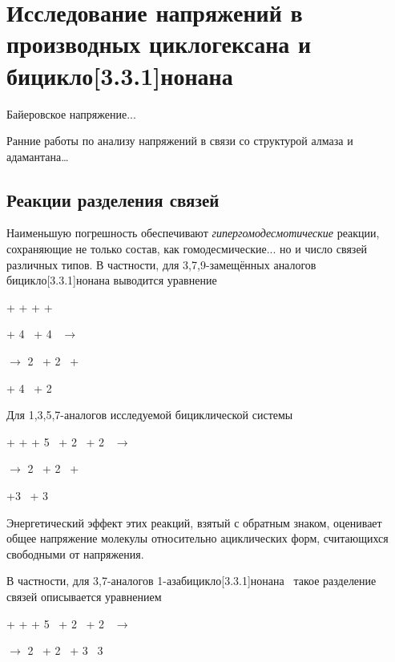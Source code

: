 \chapter{Исследование напряжений в производных циклогексана и бицикло[3.3.1]нонана}\label{ch:Strain:331}

Байеровское напряжение...

Ранние работы по анализу напряжений в связи со структурой алмаза и адамантана\dots~\cite{Mohr:1918}

\section{Реакции разделения связей}

Наименьшую погрешность обеспечивают \emph{гипергомодесмотические} реакции, сохраняющие не только состав, как гомодесмические... но и число связей различных типов. В частности, для 3,7,9-замещённых аналогов бицикло[3.3.1]нонана выводится уравнение
\begin{center}
 + \DrawMeXMe{} + \DrawMeYMe{} + \DrawMeZMe{} +

+ 4~\DrawPropane{} + 4~\DrawIsoButane{}
  \(\longrightarrow\)

\(\longrightarrow\) 2~ + 2~ +

+ 4~\DrawIsoPentane{} + 2~
\end{center}

Для 1,3,5,7-аналогов исследуемой бициклической системы
\begin{center}
   + \DrawMeXMe{} + \DrawMeYMe{} + 5~\DrawPropane{} + 2~ + 2~
  \(\longrightarrow\)

  \(\longrightarrow\) 2~ + 2~ +

  +3~ + 3~
\end{center}

Энергетический эффект этих реакций, взятый с обратным знаком, оценивает общее напряжение молекулы относительно ациклических форм, считающихся свободными от напряжения.

В частности, для 3,7-аналогов 1-азабицикло[3.3.1]нонана~ такое разделение связей описывается уравнением
\begin{center}
  + \DrawMeXMe{} + \DrawMeYMe{} + 5~\DrawPropane{}
  + 2~\DrawIsoButane{} + 2~\DrawMeNMeMe{}
  \(\longrightarrow\)

  \(\longrightarrow\)
  2~ + 2~ + 3~\DrawIsoPentane{}
  3~\DrawMeNMeEt{}
\end{center}

